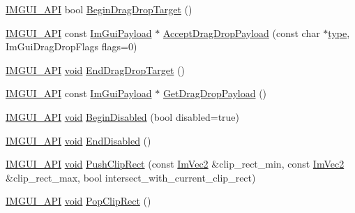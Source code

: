 \begin{DoxyCompactItemize}
\item 
\hyperlink{imgui_8h_a43829975e84e45d1149597467a14bbf5}{I\+M\+G\+U\+I\+\_\+\+A\+PI} bool \hyperlink{namespaceImGui_ac42384c3181406bbd0f3f4f77a73c7ed}{Begin\+Drag\+Drop\+Target} ()
\item 
\hyperlink{imgui_8h_a43829975e84e45d1149597467a14bbf5}{I\+M\+G\+U\+I\+\_\+\+A\+PI} const \hyperlink{structImGuiPayload}{Im\+Gui\+Payload} $\ast$ \hyperlink{namespaceImGui_a5e0dac39e249bf50e2ae96dc4a97cb18}{Accept\+Drag\+Drop\+Payload} (const char $\ast$\hyperlink{imgui__impl__opengl3__loader_8h_a63267399cd2a2ee217572c11d2e54f07}{type}, Im\+Gui\+Drag\+Drop\+Flags flags=0)
\item 
\hyperlink{imgui_8h_a43829975e84e45d1149597467a14bbf5}{I\+M\+G\+U\+I\+\_\+\+A\+PI} \hyperlink{imgui__impl__opengl3__loader_8h_ac668e7cffd9e2e9cfee428b9b2f34fa7}{void} \hyperlink{namespaceImGui_ae8313266214728f86c2cb7cb30a30e89}{End\+Drag\+Drop\+Target} ()
\item 
\hyperlink{imgui_8h_a43829975e84e45d1149597467a14bbf5}{I\+M\+G\+U\+I\+\_\+\+A\+PI} const \hyperlink{structImGuiPayload}{Im\+Gui\+Payload} $\ast$ \hyperlink{namespaceImGui_a1756b37d61154de489f1520179b4e294}{Get\+Drag\+Drop\+Payload} ()
\item 
\hyperlink{imgui_8h_a43829975e84e45d1149597467a14bbf5}{I\+M\+G\+U\+I\+\_\+\+A\+PI} \hyperlink{imgui__impl__opengl3__loader_8h_ac668e7cffd9e2e9cfee428b9b2f34fa7}{void} \hyperlink{namespaceImGui_ae90e9a26f01d0d45f6bf7ca720d170d1}{Begin\+Disabled} (bool disabled=true)
\item 
\hyperlink{imgui_8h_a43829975e84e45d1149597467a14bbf5}{I\+M\+G\+U\+I\+\_\+\+A\+PI} \hyperlink{imgui__impl__opengl3__loader_8h_ac668e7cffd9e2e9cfee428b9b2f34fa7}{void} \hyperlink{namespaceImGui_a9e6088c6c690ddff1302b6e42b380733}{End\+Disabled} ()
\item 
\hyperlink{imgui_8h_a43829975e84e45d1149597467a14bbf5}{I\+M\+G\+U\+I\+\_\+\+A\+PI} \hyperlink{imgui__impl__opengl3__loader_8h_ac668e7cffd9e2e9cfee428b9b2f34fa7}{void} \hyperlink{namespaceImGui_a11c8bd8676e1281e15b24c9615b6904a}{Push\+Clip\+Rect} (const \hyperlink{structImVec2}{Im\+Vec2} \&clip\+\_\+rect\+\_\+min, const \hyperlink{structImVec2}{Im\+Vec2} \&clip\+\_\+rect\+\_\+max, bool intersect\+\_\+with\+\_\+current\+\_\+clip\+\_\+rect)
\item 
\hyperlink{imgui_8h_a43829975e84e45d1149597467a14bbf5}{I\+M\+G\+U\+I\+\_\+\+A\+PI} \hyperlink{imgui__impl__opengl3__loader_8h_ac668e7cffd9e2e9cfee428b9b2f34fa7}{void} \hyperlink{namespaceImGui_aef1c8a6e5a3c70cb10d03d2a2a66dfd8}{Pop\+Clip\+Rect} ()

\end{DoxyCompactItemize}
